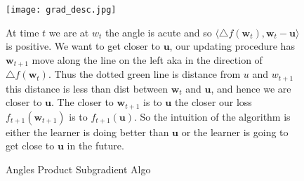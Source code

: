 \documentclass[11pt]{article}
\newcommand\fnote[1]{\captionsetup{font=small}\caption*{#1}}
\theoremstyle{quest}
\begin{document}
\begin{figure}[!h]
\centering 
\caption{Angles Product Subgradient Algo}
\texttt{[image: grad\_desc.jpg]}
\fnote{At time $t$ we are at $w_t$ the angle is acute and so $\langle \triangle f(\mathbf{w}_t), \mathbf{w}_t-\mathbf{u}\rangle$ is positive. We want to get closer to $\mathbf{u}$, our updating procedure has $\mathbf{w}_{t+1}$ move along the line on the left aka in the direction of $\triangle f(\mathbf{w}_t)$. Thus the dotted green line is distance from $u$ and $w_{t+1}$ this distance is less than dist between $\mathbf{w}_t$ and $\mathbf{u}$, and hence we are closer to $\mathbf{u}$. The closer to $\mathbf{w}_{t+1}$ is to $\mathbf{u}$ the closer our loss $f_{t+1}(\mathbf{w}_{t+1})$ is to  $f_{t+1}(\mathbf{u})$. So the intuition of the algorithm is either the learner is doing better than $\mathbf{u}$ or the learner is going to get close to $\mathbf{u}$ in the future.}
\end{figure}
\FloatBarrier
\end{document}
